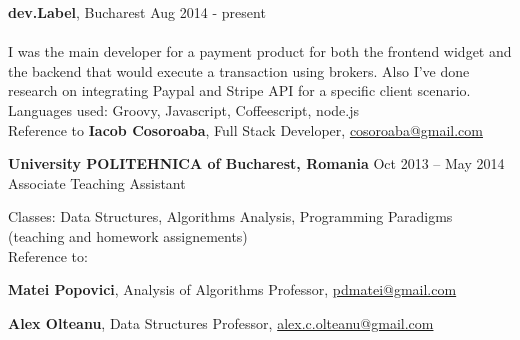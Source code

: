 \documentclass[margin,line]{resume}
\begin{document}
\begin{resume}
    \vspace{1.2mm}\textbf{dev.Label}, Bucharest
    	\hfill Aug 2014 - present\vspace{1mm}\\
    \selectfont{Frontend \& Backend Developer}\vspace{1.2mm}\\
    {\fontsize{2.65mm}{1em}\selectfont
      I was the main developer for a payment product for both the frontend widget and the backend that would execute a transaction using brokers. Also I've done research on integrating Paypal and Stripe API for a specific client scenario.\\
      Languages used: Groovy, Javascript, Coffeescript, node.js\\
      Reference to \textbf{Iacob Cosoroaba}, Full Stack Developer, \href{mailto:cosoroaba@gmail.com}{cosoroaba@gmail.com}
     }

	\vspace{1.2mm}\textbf{University POLITEHNICA of Bucharest, Romania}
		\hfill Oct 2013 -- May 2014\vspace{1mm}\\
		Associate Teaching Assistant\vspace{1.2mm}\\
    {\fontsize{2.65mm}{1em}\selectfont
      Classes: Data Structures, Algorithms Analysis, Programming Paradigms (teaching and homework assignements)\\
      Reference to:
      \begin{list2}
          \item \textbf{Matei Popovici}, Analysis of Algorithms Professor, \href{mailto:pdmatei@gmail.com}{pdmatei@gmail.com}
          \item \textbf{Alex Olteanu}, Data Structures Professor, \href{mailto:alex.c.olteanu@gmail.com}{alex.c.olteanu@gmail.com}
      \end{list2}
    }


\end{resume}
\end{document}
